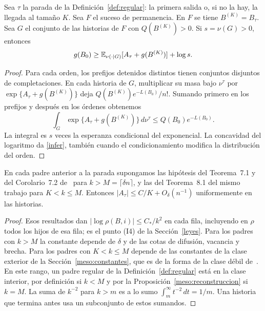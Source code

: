 \begin{proposicion}\label{hist:inferior}
Sea $\tau$ la parada de la Definición~\ref{def:regular}: la primera salida o, si no la hay, la
llegada al tamaño $K$. Sea $F$ el suceso de permanencia. En $F$ se tiene $B^{(K)}=B_\tau$.
Sea $G$ el conjunto de las historias de $F$ con $Q(B^{(K)})>0$. Si $s=\nu(G)>0$, entonces
\begin{equation}\label{infer}
 g(B_0)\ge \mathbb{E}_{\nu(\cdot\mid G)}[A_\tau+g(B^{(K)})]+\log s.
\end{equation}
\end{proposicion}
\begin{proof}
Para cada orden, los prefijos detenidos distintos tienen conjuntos disjuntos de completaciones.
En cada historia de $G$, multiplicar su masa bajo $\nu^\tau$ por $\exp\{A_\tau+g(B^{(K)})\}$
deja $Q(B^{(K)})e^{-L(B_0)}/n!$. Sumando primero en los prefijos y después en los órdenes obtenemos
\[
 \int_G\exp\{A_\tau+g(B^{(K)})\}\,d\nu^\tau\le Q(B_0)e^{-L(B_0)} .
\]
La integral es $s$ veces la esperanza condicional del exponencial. La concavidad del logaritmo
da \eqref{infer}, también cuando el condicionamiento modifica la distribución del orden.
\end{proof}

\begin{corolario}\label{hist:consistencia}
En cada padre anterior a la parada supongamos las hipótesis del Teorema~7.1 y del Corolario~7.2
de~\cite{pred} para $k>M=\lceil\delta n\rceil$, y las del Teorema~8.1 del mismo trabajo para
$K<k\le M$. Entonces $|A_\tau|\le C/K+O_\delta(n^{-1})$ uniformemente en las historias.
\end{corolario}
\begin{proof}
Esos resultados dan $|\log\rho(B,i)|\le C_*/k^2$ en cada fila, incluyendo en $\rho$ todos los
hijos de esa fila; es el punto (I4) de la Sección~\ref{leyes}. Para los padres con $k>M$ la constante
depende de $\delta$ y de las cotas de
difusión, vacancia y brecha. Para los padres con $K<k\le M$ depende de las constantes de la clase
exterior de la Sección~\ref{meso:constantes}, que es de la forma de la clase débil
de~\cite[Sección~8.1]{pred}. En este rango, un padre regular de la Definición~\ref{def:regular}
está en la clase interior, por definición si $k<M$ y por la Proposición~\ref{meso:reconstruccion}
si $k=M$. La suma de $k^{-2}$ para $k>m$ es a lo sumo $\int_m^\infty t^{-2}\,dt=1/m$.
Una historia que termina antes usa un
subconjunto de estos sumandos.
\end{proof}
